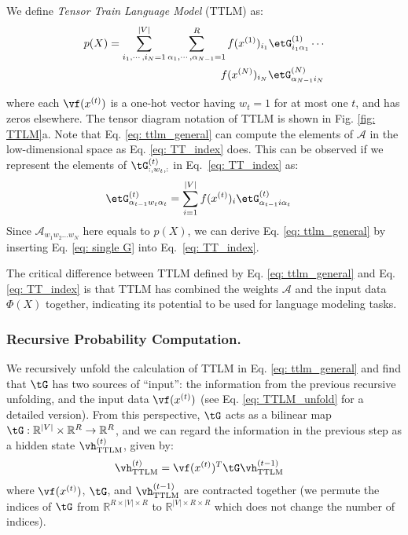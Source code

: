 We define \textit{Tensor Train Language Model} (TTLM) as: 
\begin{equation}
\begin{split}
    p(X) = \sum_{i_1, \cdots, i_N = 1}^{|V|} \sum_{\alpha_1, \cdots, \alpha_{N-1} = 1}^R f(x^{(1)})_{i_1}\etG^{(1)}_{i_1\alpha_1} \cdots \\ f(x^{(N)})_{i_N}\etG^{(N)}_{\alpha_{N-1}i_N}  \label{eq: ttlm_general}
\end{split}
\end{equation}

where each $\vf(x^{(t)})$ is a one-hot vector having $w_t = 1$ for at most one $t$, and has zeros elsewhere. The tensor diagram notation of TTLM is shown in Fig. \ref{fig: TTLM}a. Note that  Eq. \ref{eq: ttlm_general} can compute the elements
of $\mathcal{A}$ in the low-dimensional space as Eq. \ref{eq: TT_index} does. This can be observed  if we represent the elements of  $\tG^{(t)}_{:, w_t, :}$ in Eq.\ \ref{eq: TT_index} as:
%
\begin{align}
    \label{eq: single G}
    \etG^{(t)}_{\alpha_{t-1}w_t\alpha_{t}}
    & = \sum_{{i = 1}}^{|V|} f(x^{(t)})_{i}\etG^{(t)}_{\alpha_{t-1}i\alpha_{t}} 
\end{align}
% 
Since  $\mathcal{A}_{w_1w_2...w_N}$  here equals to  $p(X)$, we can derive Eq. \ref{eq: ttlm_general} by inserting Eq. \ref{eq: single G} into Eq.\ \ref{eq: TT_index}.

The critical difference between TTLM defined by Eq. \ref{eq: ttlm_general} and  Eq. \ref{eq: TT_index}  is that TTLM has combined the weights $\mathcal{A}$ and the input data $\Phi(X)$  together, indicating its potential to be used for language modeling tasks.

\subsubsection{Recursive Probability Computation.}
\label{sec:recursive probability}
We recursively unfold the calculation of TTLM in Eq. \ref{eq: ttlm_general} and find that $\tG$ has two sources of ``input'': the information from the previous recursive unfolding, and the input data $\vf(x^{(t)})$ (see Eq. \ref{eq: TTLM_unfold} for a detailed version). 
From this perspective, $\tG$ acts as a bilinear map $\tG: \mathbb{R}^{|V|} \times \mathbb{R}^R \rightarrow \mathbb{R}^R $, and we can regard the information in the previous step as a hidden state $\vh^{(t)}_\text{TTLM}$, given by:
%
\begin{align}
    \label{eq: ttlm cell full}
    \vh^{(t)}_{\textrm{TTLM}}
    & = \vf(x^{(t)})^T\tG  \vh^{(t-1)}_{\textrm{TTLM}} 
\end{align}
%
where $\vf(x^{(t)})$, $\tG$, and  $\vh^{(t-1)}_{\textrm{TTLM}}$ are contracted together (we permute the indices of $\tG$ from $\mathbb{R}^{R \times |V| \times R}$ to $\mathbb{R}^{|V| \times R \times R}$ which does not change the number of indices). 

